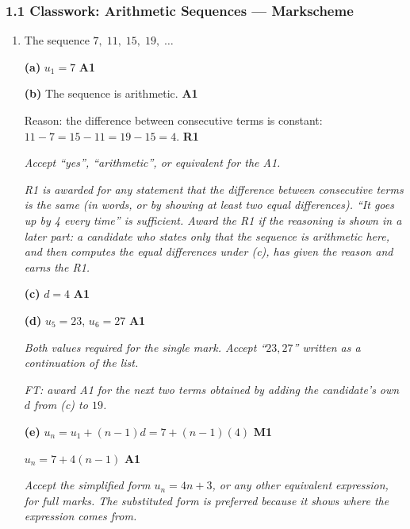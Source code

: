 \documentclass[12pt, twoside]{article}
\begin{document}
\subsubsection*{1.1 Classwork: Arithmetic Sequences --- Markscheme}

\begin{enumerate}[itemsep=0.3cm]

\item[1.] [Maximum mark: 8]

The sequence $7,\; 11,\; 15,\; 19,\; \ldots$

\medskip

\textbf{(a)} $u_{1} = 7$ \hfill \textbf{A1}

\medskip

\textbf{(b)} The sequence is arithmetic. \hfill \textbf{A1}

Reason: the difference between consecutive terms is constant:
$11 - 7 = 15 - 11 = 19 - 15 = 4$. \hfill \textbf{R1}

\emph{Accept ``yes'', ``arithmetic'', or equivalent for the A1.}

\emph{R1 is awarded for any statement that the difference between
consecutive terms is the same (in words, or by showing at least two
equal differences). ``It goes up by 4 every time'' is sufficient.
Award the R1 if the reasoning is shown in a later part: a candidate who
states only that the sequence is arithmetic here, and then computes the
equal differences under (c), has given the reason and earns the R1.}

\medskip

\textbf{(c)} $d = 4$ \hfill \textbf{A1}

\medskip

\textbf{(d)} $u_{5} = 23$, $u_{6} = 27$ \hfill \textbf{A1}

\emph{Both values required for the single mark. Accept
``$23, 27$'' written as a continuation of the list.}

\emph{FT: award A1 for the next two terms obtained by adding the
candidate's own $d$ from (c) to $19$.}

\medskip

\textbf{(e)} $u_{n} = u_{1} + (n-1)d = 7 + (n-1)(4)$ \hfill \textbf{M1}

$u_{n} = 7 + 4(n-1)$ \hfill \textbf{A1}

\emph{Accept the simplified form $u_{n} = 4n + 3$, or any other equivalent
expression, for full marks. The substituted form is preferred because it shows
where the expression comes from.}


\end{enumerate}
\end{document}
